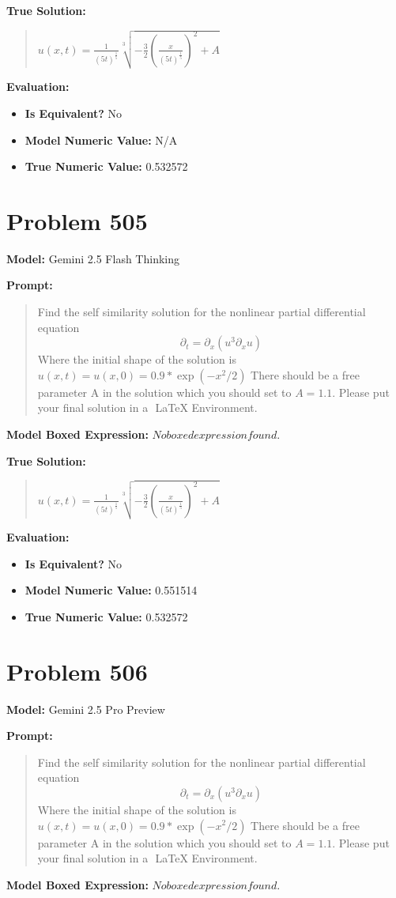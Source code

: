 \documentclass{article}
\begin{document}
\textbf{True Solution:}
\begin{quote}
$u(x,t) = \frac{1}{(5t)^{\frac{1}{5}}} \sqrt[3]{-\frac{3}{2}\left(\frac{x}{(5t)^{\frac{1}{5}}}\right)^2 + A}$
\end{quote}

\textbf{Evaluation:}
\begin{itemize}
\item \textbf{Is Equivalent?} No
\item \textbf{Model Numeric Value:} N/A
\item \textbf{True Numeric Value:} 0.532572
\end{itemize}
\vspace{1cm}
\section*{Problem 505}
\textbf{Model:} Gemini 2.5 Flash Thinking

\textbf{Prompt:}
\begin{quote}
Find the self similarity solution for the nonlinear partial differential equation $$\partial_t = \partial_x (u^3 \partial_xu) $$ Where the initial shape of the solution is $u(x, t)=u(x, 0)= 0.9 * \exp(-x^2 /2)$ There should be a free parameter A in the solution which you should set to $A =1.1$. Please put your final solution in a $\boxed{}$ LaTeX Environment.
\end{quote}
\textbf{Model Boxed Expression:} $No boxed expression found.$

\textbf{True Solution:}
\begin{quote}
$u(x,t) = \frac{1}{(5t)^{\frac{1}{5}}} \sqrt[3]{-\frac{3}{2}\left(\frac{x}{(5t)^{\frac{1}{5}}}\right)^2 + A}$
\end{quote}

\textbf{Evaluation:}
\begin{itemize}
\item \textbf{Is Equivalent?} No
\item \textbf{Model Numeric Value:} 0.551514
\item \textbf{True Numeric Value:} 0.532572
\end{itemize}
\vspace{1cm}
\section*{Problem 506}
\textbf{Model:} Gemini 2.5 Pro Preview

\textbf{Prompt:}
\begin{quote}
Find the self similarity solution for the nonlinear partial differential equation $$\partial_t = \partial_x (u^3 \partial_xu) $$ Where the initial shape of the solution is $u(x, t)=u(x, 0)= 0.9 * \exp(-x^2 /2)$ There should be a free parameter A in the solution which you should set to $A =1.1$. Please put your final solution in a $\boxed{}$ LaTeX Environment.
\end{quote}
\textbf{Model Boxed Expression:} $No boxed expression found.$
\end{document}
